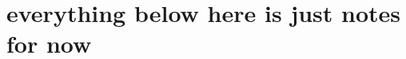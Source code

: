 \documentclass{article}\usepackage[]{graphicx}\usepackage[]{color}
\begin{document}















\newpage 

\section*{everything below here is just notes for now}
\end{document}
